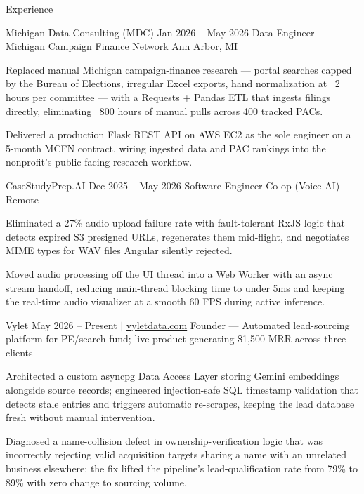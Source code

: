 \documentclass[
	11pt
]{../../../template}
\begin{document}
	\begin{rSection}{E}{xperience}
		\begin{rSectionEntry}
			{Michigan Data Consulting (MDC)}
			{Jan 2026 -- May 2026}
			{Data Engineer --- Michigan Campaign Finance Network}
			{}
			{Ann Arbor, MI}

			\item Replaced manual Michigan campaign-finance research --- portal searches capped by the Bureau of Elections, irregular Excel exports, hand normalization at ~2 hours per committee --- with a Requests + Pandas ETL that ingests filings directly, eliminating ~800 hours of manual pulls across 400 tracked PACs.
			\item Delivered a production Flask REST API on AWS EC2 as the sole engineer on a 5-month MCFN contract, wiring ingested data and PAC rankings into the nonprofit's public-facing research workflow.
		\end{rSectionEntry}

		\begin{rSectionEntry}
			{CaseStudyPrep.AI}
			{Dec 2025 -- May 2026}
			{Software Engineer Co-op (Voice AI)}
			{}
			{Remote}

			\item Eliminated a 27\% audio upload failure rate with fault-tolerant RxJS logic that detects expired S3 presigned URLs, regenerates them mid-flight, and negotiates MIME types for WAV files Angular silently rejected.
			\item Moved audio processing off the UI thread into a Web Worker with an async stream handoff, reducing main-thread blocking time to under 5ms and keeping the real-time audio visualizer at a smooth 60 FPS during active inference.
		\end{rSectionEntry}

		\begin{rSectionEntry}
			{Vylet}
			{May 2026 -- Present $\vert$ \href{https://vyletdata.com}{vyletdata.com}}
			{Founder --- Automated lead-sourcing platform for PE/search-fund; live product generating \$1,500 MRR across three clients}
			{}
			{}

			\item Architected a custom asyncpg Data Access Layer storing Gemini embeddings alongside source records; engineered injection-safe SQL timestamp validation that detects stale entries and triggers automatic re-scrapes, keeping the lead database fresh without manual intervention.
			\item Diagnosed a name-collision defect in ownership-verification logic that was incorrectly rejecting valid acquisition targets sharing a name with an unrelated business elsewhere; the fix lifted the pipeline's lead-qualification rate from 79\% to 89\% with zero change to sourcing volume.
		\end{rSectionEntry}


\end{rSection}
\end{document}
